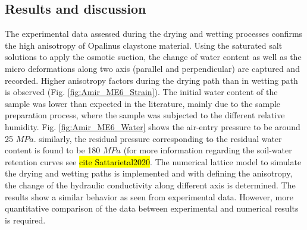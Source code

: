 \subsection{Results and discussion}

The experimental data assessed during the drying and wetting processes confirms the high anisotropy of Opalinus claystone material. Using the saturated salt solutions to apply the osmotic suction, the change of water content as well as the micro deformations along two axis (parallel and perpendicular) are captured and recorded. Higher anisotropy factors during the drying path than in wetting path is observed (Fig. \ref{fig:Amir_ME6_Strain}). The initial water content of the sample was lower than expected in the literature, mainly due to the sample preparation process, where the sample was subjected to the different relative humidity. Fig. \ref{fig:Amir_ME6_Water} shows the air-entry pressure to be around 25 $MPa$. similarly, the residual pressure corresponding to the residual water content is found to be 180 $MPa$ (for more information regarding the soil-water retention curves see \hl{cite Sattarietal2020}. The numerical lattice model to simulate the drying and wetting paths is implemented and with defining the anisotropy, the change of the hydraulic conductivity along different axis is determined. The results show a similar behavior as seen from experimental data. However, more quantitative comparison of the data between experimental and numerical results is required. 